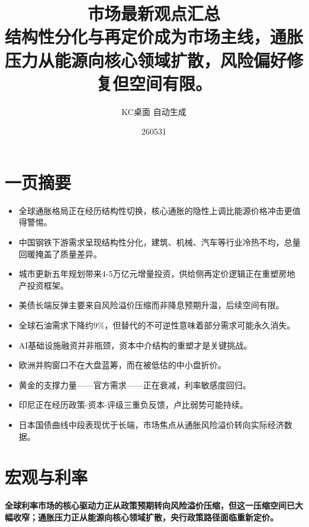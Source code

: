 \documentclass[11pt]{ctexart}
\title{\textbf{市场最新观点汇总}\\[0.4em]{\large 结构性分化与再定价成为市场主线，通胀压力从能源向核心领域扩散，风险偏好修复但空间有限。}}
\author{KC桌面 自动生成}
\date{260531}
\begin{document}
\maketitle
\section*{一页摘要}
\begin{itemize}
  \item 全球通胀格局正在经历结构性切换，核心通胀的隐性上调比能源价格冲击更值得警惕。
  \item 中国钢铁下游需求呈现结构性分化，建筑、机械、汽车等行业冷热不均，总量回暖掩盖了质量差异。
  \item 城市更新五年规划带来4-5万亿元增量投资，供给侧再定价逻辑正在重塑房地产投资框架。
  \item 美债长端反弹主要来自风险溢价压缩而非降息预期升温，后续空间有限。
  \item 全球石油需求下降约9\%，但替代的不可逆性意味着部分需求可能永久消失。
  \item AI基础设施融资并非瓶颈，资本中介结构的重塑才是关键挑战。
  \item 欧洲并购窗口不在大盘蓝筹，而在被低估的中小盘折价。
  \item 黄金的支撑力量——官方需求——正在衰减，利率敏感度回归。
  \item 印尼正在经历政策-资本-评级三重负反馈，卢比弱势可能持续。
  \item 日本国债曲线中段表现优于长端，市场焦点从通胀风险溢价转向实际经济数据。
\end{itemize}
\section{宏观与利率}
\textbf{全球利率市场的核心驱动力正从政策预期转向风险溢价压缩，但这一压缩空间已大幅收窄；通胀压力正从能源向核心领域扩散，央行政策路径面临重新定价。}
\end{document}
